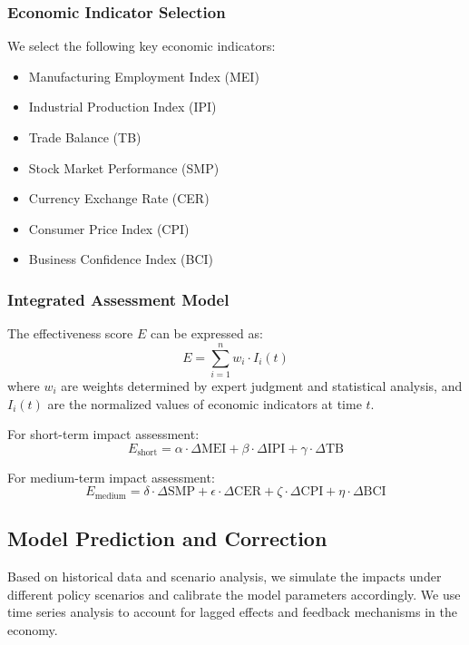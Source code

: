 \documentclass[12pt]{article}
\begin{document}
\subsubsection{Economic Indicator Selection}
We select the following key economic indicators:
\begin{itemize}
    \item Manufacturing Employment Index (MEI)
    \item Industrial Production Index (IPI)
    \item Trade Balance (TB)
    \item Stock Market Performance (SMP)
    \item Currency Exchange Rate (CER)
    \item Consumer Price Index (CPI)
    \item Business Confidence Index (BCI)
\end{itemize}

\subsubsection{Integrated Assessment Model}
The effectiveness score $E$ can be expressed as:
\[
E = \sum_{i=1}^{n} w_i \cdot I_i(t)
\]
where $w_i$ are weights determined by expert judgment and statistical analysis, and $I_i(t)$ are the normalized values of economic indicators at time $t$.

For short-term impact assessment:
\[
E_{\text{short}} = \alpha \cdot \Delta\text{MEI} + \beta \cdot \Delta\text{IPI} + \gamma \cdot \Delta\text{TB}
\]

For medium-term impact assessment:
\[
E_{\text{medium}} = \delta \cdot \Delta\text{SMP} + \epsilon \cdot \Delta\text{CER} + \zeta \cdot \Delta\text{CPI} + \eta \cdot \Delta\text{BCI}
\]

\subsection{Model Prediction and Correction}
Based on historical data and scenario analysis, we simulate the impacts under different policy scenarios and calibrate the model parameters accordingly. We use time series analysis to account for lagged effects and feedback mechanisms in the economy.
\end{document}
